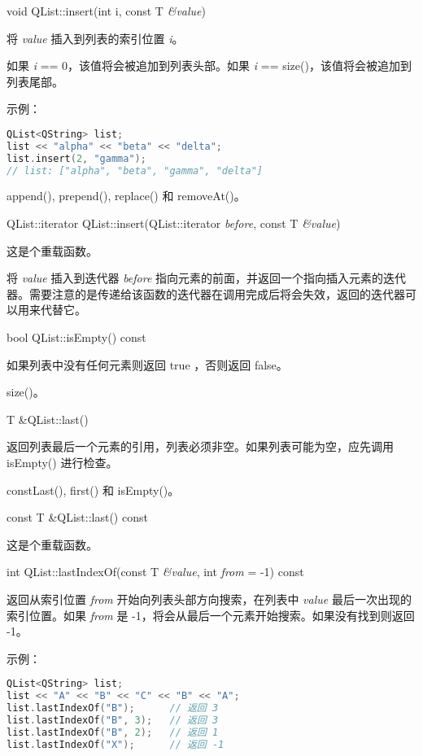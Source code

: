 void QList::insert(int i, const T \emph{\&value})

将 \emph{value} 插入到列表的索引位置 \emph{i}。

如果 \emph{i} == 0，该值将会被追加到列表头部。如果 \emph{i} == size()，该值将会被追加到列表尾部。

示例：


\begin{lstlisting}[language=C++]
QList<QString> list;
list << "alpha" << "beta" << "delta";
list.insert(2, "gamma");
// list: ["alpha", "beta", "gamma", "delta"]
\end{lstlisting}



\begin{notice}[另请参阅]
append(), prepend(), replace() 和 removeAt()。
\end{notice}

QList::iterator QList::insert(QList::iterator \emph{before}, const T \emph{\&value})

这是个重载函数。

将 \emph{value} 插入到迭代器 \emph{before} 指向元素的前面，并返回一个指向插入元素的迭代器。需要注意的是传递给该函数的迭代器在调用完成后将会失效，返回的迭代器可以用来代替它。

bool QList::isEmpty() const

如果列表中没有任何元素则返回 true ，否则返回 false。

\begin{notice}[另请参阅]
size()。
\end{notice}


T \&QList::last()

返回列表最后一个元素的引用，列表必须非空。如果列表可能为空，应先调用 isEmpty() 进行检查。


\begin{notice}[另请参阅]
constLast(), first() 和 isEmpty()。
\end{notice}


const T \&QList::last() const

这是个重载函数。

int QList::lastIndexOf(const T \emph{\&value}, int \emph{from} = -1) const

返回从索引位置 \emph{from} 开始向列表头部方向搜索，在列表中 \emph{value} 最后一次出现的索引位置。如果 \emph{from} 是 -1，将会从最后一个元素开始搜索。如果没有找到则返回 -1。

示例：

\begin{lstlisting}[language=C++]
QList<QString> list;
list << "A" << "B" << "C" << "B" << "A";
list.lastIndexOf("B");      // 返回 3
list.lastIndexOf("B", 3);   // 返回 3
list.lastIndexOf("B", 2);   // 返回 1
list.lastIndexOf("X");      // 返回 -1
\end{lstlisting}

